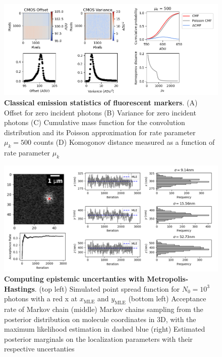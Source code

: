 \documentclass{ucetd}
\begin{document}
\begin{figure}
\begin{center}
\includegraphics[width=16cm]{Noise.png}
\end{center}
\caption{\textbf{Classical emission statistics of fluorescent markers}. (A) Offset for zero incident photons (B) Variance for zero incident photons (C) Cumulative mass function for the convolution distribution and its Poisson approximation for rate parameter $\mu_{k} = 500$ counts (D) Komogonov distance measured as a function of rate parameter $\mu_{k}$}
\end{figure}

\begin{figure}
\begin{center}
\includegraphics[width=16cm]{MCMC.png}
\end{center}
\caption{\textbf{Computing epistemic uncertanties with Metropolis-Hastings}. (top left) Simulated point spread function for $N_{0}=10^{3}$ photons with a red x at $x_{\mathrm{MLE}}$ and $y_{\mathrm{MLE}}$ (bottom left) Acceptance rate of Markov chain (middle) Markov chains sampling from the posterior distribution on molecule coordinates in 3D, with the maximum likelihood estimation in dashed blue (right) Estimated posterior marginals on the localization parameters with their respective uncertanties}
\end{figure}
\end{document}

